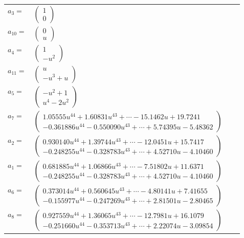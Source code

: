 \documentclass[1p]{elsarticle_modified}
\theoremstyle{definition}
\begin{document}
\begin{tabular}{m{7pt} m{180pt} m{7pt} m{180pt} }
\flushright $a_{3}=$&$\begin{pmatrix}1\\0\end{pmatrix}$ \\
\flushright $a_{10}=$&$\begin{pmatrix}0\\u\end{pmatrix}$ \\
\flushright $a_{4}=$&$\begin{pmatrix}1\\- u^2\end{pmatrix}$ \\
\flushright $a_{11}=$&$\begin{pmatrix}u\\- u^3+u\end{pmatrix}$ \\
\flushright $a_{5}=$&$\begin{pmatrix}- u^2+1\\u^4-2 u^2\end{pmatrix}$ \\
\flushright $a_{7}=$&$\begin{pmatrix}1.05555 u^{44}+1.60831 u^{43}+\cdots-15.1462 u+19.7241\\-0.361886 u^{44}-0.550090 u^{43}+\cdots+5.74395 u-5.48362\end{pmatrix}$ \\
\flushright $a_{2}=$&$\begin{pmatrix}0.930140 u^{44}+1.39744 u^{43}+\cdots-12.0451 u+15.7417\\-0.248255 u^{44}-0.328783 u^{43}+\cdots+4.52710 u-4.10460\end{pmatrix}$ \\
\flushright $a_{1}=$&$\begin{pmatrix}0.681885 u^{44}+1.06866 u^{43}+\cdots-7.51802 u+11.6371\\-0.248255 u^{44}-0.328783 u^{43}+\cdots+4.52710 u-4.10460\end{pmatrix}$ \\
\flushright $a_{6}=$&$\begin{pmatrix}0.373014 u^{44}+0.560645 u^{43}+\cdots-4.80141 u+7.41655\\-0.155977 u^{44}-0.247269 u^{43}+\cdots+2.81501 u-2.80465\end{pmatrix}$ \\
\flushright $a_{8}=$&$\begin{pmatrix}0.927559 u^{44}+1.36065 u^{43}+\cdots-12.7981 u+16.1079\\-0.251660 u^{44}-0.353713 u^{43}+\cdots+2.22074 u-3.09854\end{pmatrix}$ \\

\end{tabular}
\end{document}
